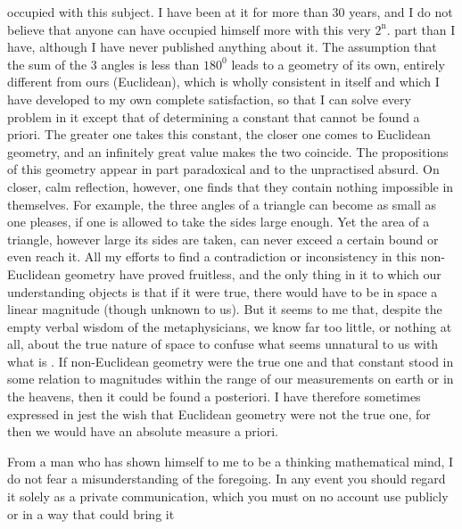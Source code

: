 occupied with this subject. I have been at it for more than 30 years, and I do not believe
that anyone can have occupied himself more with this very $2^{\mathrm n}.$ part than I have,
although I have never published anything about it. The assumption that the sum of the 3
angles is less than $180^{0}$ leads to a geometry of its own, entirely
different from ours (Euclidean), which is wholly consistent in itself and which I have
developed to my own complete satisfaction, so that I can solve every problem in it except
that of determining a constant that cannot be found a priori. The greater
one takes this constant, the closer one comes to Euclidean geometry, and an
infinitely great value makes the two coincide. The propositions of this geometry appear in
part paradoxical and to the unpractised absurd. On closer, calm reflection, however, one finds
that they contain nothing impossible in themselves. For example, the three angles of a
triangle can become as small as one pleases, if one is allowed to take the sides large enough.
Yet the area of a triangle, however large its sides are taken, can never
exceed a certain bound or even reach it. All my efforts to find
a contradiction or inconsistency in this non-Euclidean geometry have
proved fruitless, and the only thing in it to which our understanding objects is that if
it were true, there would have to be in space a linear magnitude  (though unknown to us).
But it seems to me that, despite the empty verbal wisdom of the metaphysicians, we
know far too little, or nothing at all, about the true nature of space to
confuse what seems unnatural to us with what is . If
non-Euclidean geometry were the true one and that constant stood in some relation to
magnitudes within the range of our measurements on earth or in the heavens, then it could
be found a posteriori. I have therefore sometimes expressed in jest the wish
that Euclidean geometry were not the true one, for then we would have an absolute measure
a priori.

From a man who has shown himself to me to be a thinking mathematical mind, I do not
fear a misunderstanding of the foregoing. In any event you should regard it solely as
a private communication, which you must on no account use publicly or in a way that could
bring it\space%
